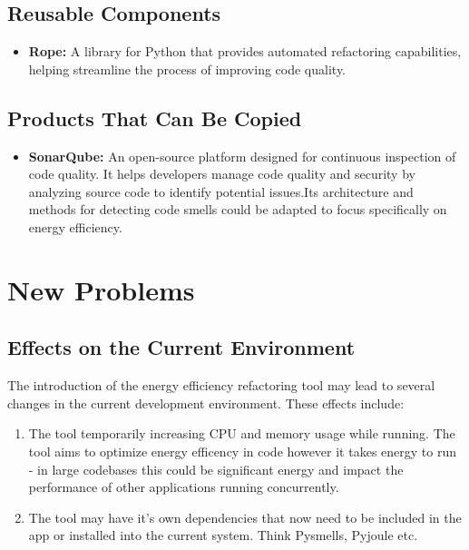 \documentclass[12pt]{article}
\begin{document}
\subsection{Reusable Components}
\begin{itemize}
  \item \textbf{Rope:} A library for Python that provides automated refactoring capabilities, helping streamline the process of improving code quality.
\end{itemize}
\subsection{Products That Can Be Copied}
\begin{itemize}
  \item \textbf{SonarQube:} An open-source platform designed for continuous inspection of code quality. It helps developers manage code quality and security by analyzing source code to identify potential issues.Its architecture and methods for detecting code smells could be adapted to focus specifically on energy efficiency. 
\end{itemize}

\section{New Problems}
\subsection{Effects on the Current Environment}
The introduction of the energy efficiency refactoring tool may lead to several changes in the current development environment. These effects include:
\begin{enumerate}
  \item The tool temporarily increasing CPU and memory usage while running. The tool aims to optimize energy efficency in code however it takes energy to run - in large codebases this could be significant energy and impact the performance of other applications running concurrently. 
  \item The tool may have it's own dependencies that now need to be included in the app or installed into the current system. Think Pysmells, Pyjoule etc.
\end{enumerate}
\end{document}
